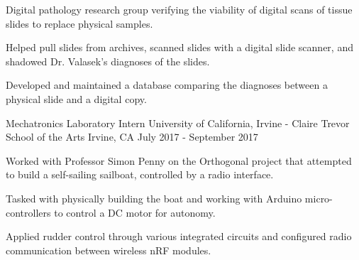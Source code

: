 \begin{cventries}
{\begin{cvitems}
        \item {Digital pathology research group verifying the viability of digital scans of tissue slides to replace physical samples.}
        \item {Helped pull slides from archives, scanned slides with a digital slide scanner, and shadowed Dr. Valasek’s diagnoses of the slides.}
        \item {Developed and maintained a database comparing the diagnoses between a physical slide and a digital copy.}
      \end{cvitems}
    }
 \cventry
    {Mechatronics Laboratory Intern} %
    {University of California, Irvine - Claire Trevor School of the Arts} %
    {Irvine, CA} %
    {July 2017 - September 2017} %
    {
      \begin{cvitems} %
        \item {Worked with Professor Simon Penny on the Orthogonal project that attempted to build a self-sailing sailboat, controlled by a radio interface.}
        \item {Tasked with physically building the boat and working with Arduino micro-controllers to control a DC motor for autonomy.}
        \item {Applied rudder control through various integrated circuits and configured radio communication between wireless nRF modules.}
      \end{cvitems}
    }
\end{cventries}
